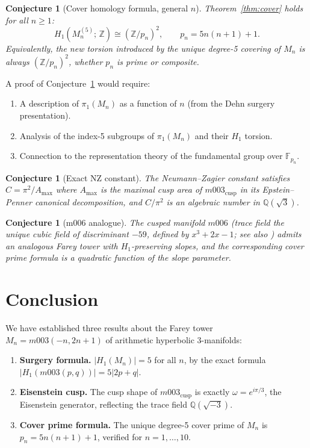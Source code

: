 \documentclass[11pt,a4paper]{article}
\newtheorem{conjecture}[theorem]{Conjecture}
\theoremstyle{definition}
\newcommand{\ZZ}{\mathbb{Z}}
\newcommand{\QQ}{\mathbb{Q}}
\newcommand{\Mn}{M_n}
\newcommand{\Mcusp}{m003_{\mathrm{cusp}}}
\begin{document}
\begin{conjecture}[Cover homology formula, general $n$]
\label{conj:main}
Theorem~\ref{thm:cover} holds for all $n \geq 1$:
\[
  H_1(M_n^{(5)};\,\ZZ) \cong (\ZZ/p_n)^2,
  \qquad p_n = 5n(n+1)+1.
\]
Equivalently, the new torsion introduced by the unique
degree-5 covering of $M_n$ is always $(\ZZ/p_n)^2$,
whether $p_n$ is prime or composite.
\end{conjecture}

A proof of Conjecture~\ref{conj:main} would require:
\begin{enumerate}
\item A description of $\pi_1(\Mn)$ as a function of $n$
  (from the Dehn surgery presentation).
\item Analysis of the index-5 subgroups of $\pi_1(\Mn)$
  and their $H_1$ torsion.
\item Connection to the representation theory of the
  fundamental group over $\mathbb{F}_{p_n}$.
\end{enumerate}

\begin{conjecture}[Exact NZ constant]
The Neumann--Zagier constant satisfies
$C = \pi^2\!/A_{\max}$ where $A_{\max}$ is the maximal cusp area
of $\Mcusp$ in its Epstein--Penner canonical decomposition,
and $C/\pi^2$ is an algebraic number in $\QQ(\sqrt{3})$.
\end{conjecture}

\begin{conjecture}[m006 analogue]
The cusped manifold $m006$ (trace field the unique cubic field
of discriminant $-59$, defined by $x^3+2x-1$; see also
\cite{GentryArith2026}) admits an analogous Farey tower
with $H_1$-preserving slopes, and the corresponding cover prime
formula is a quadratic function of the slope parameter.
\end{conjecture}

\section{Conclusion}
\label{sec:conclusion}

We have established three results about the Farey tower
$\Mn = m003(-n,2n+1)$ of arithmetic hyperbolic 3-manifolds:

\begin{enumerate}
\item \textbf{Surgery formula.} $|H_1(\Mn)| = 5$ for all $n$,
  by the exact formula $|H_1(m003(p,q))| = 5|2p+q|$.
\item \textbf{Eisenstein cusp.} The cusp shape of $\Mcusp$ is
  exactly $\omega = e^{i\pi/3}$, the Eisenstein generator,
  reflecting the trace field $\QQ(\sqrt{-3})$.
\item \textbf{Cover prime formula.} The unique degree-5
  cover prime of $\Mn$ is $p_n = 5n(n+1)+1$,
  verified for $n=1,\ldots,10$.
\end{enumerate}
\end{document}
